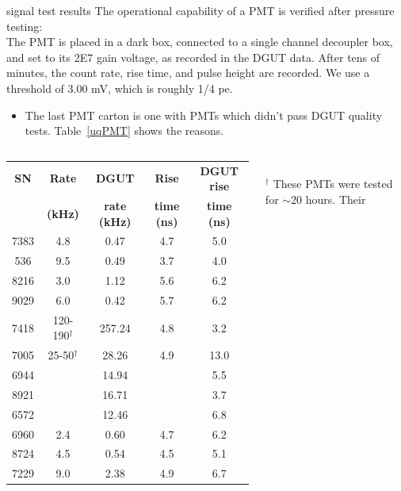 \documentclass{beamer}
\begin{document}
\begin{frame}{signal test results}
	\small The operational capability of a PMT is verified after pressure testing:\\
	{\tiny The PMT is placed in a dark box, connected to a single channel
	decoupler box, and set to its 2E7 gain voltage, as recorded in the DGUT data.
	After tens of minutes, the count rate, rise time, and pulse height are
	recorded. We use a threshold of 3.00 mV, which is roughly 1/4 pe.
	}
	\begin{itemize}
		\item The last PMT carton is one with PMTs which didn't pass DGUT quality
		tests. Table~\ref{uqPMT} shows the reasons.
	\end{itemize}
	\setlength{\tabcolsep}{2pt}
	\scriptsize
\begin{columns}[c] %
	\begin{tabular}{|c|c|c|c|c|}
		\hline
		\textbf{SN}&\textbf{Rate}&\textbf{DGUT}&\textbf{Rise}&
		\textbf{DGUT rise}\\
		&\textbf{(kHz)}&\textbf{rate (kHz)}&\textbf{time (ns)}&\textbf{time (ns)}\\
		\hline
		\hline
		7383   &4.8&0.47&4.7&5.0\\
		536   &9.5&0.49&3.7&4.0\\
		8216   &3.0&1.12&5.6&6.2\\
		9029   &6.0&0.42&5.7&6.2\\
		{\color{cyan}7418}  
&{\color{red}120-190$^\dagger$}&\color{red}257.24&4.8&3.2\\
		{\color{cyan}7005}  
&{\color{red}25-50$^\dagger$}&\color{red}28.26&4.9&13.0\\
		{\color{cyan}6944}   &&\color{red}14.94&&5.5\\
		{\color{cyan}8921}   &&\color{red}16.71&&3.7\\
		{\color{cyan}6572}   &&\color{red}12.46&&6.8\\
		{\color{cyan}6960}   &2.4&0.60&4.7&6.2\\
		{\color{cyan}8724}   &4.5&0.54&4.5&5.1\\
		{\color{cyan}7229}   &9.0&2.38&4.9&6.7\\
		\hline
	\end{tabular}
	\\ \color{red}$^\dagger$ These PMTs were tested for $\sim$20 hours. Their

\end{columns}
\end{frame}
\end{document}
